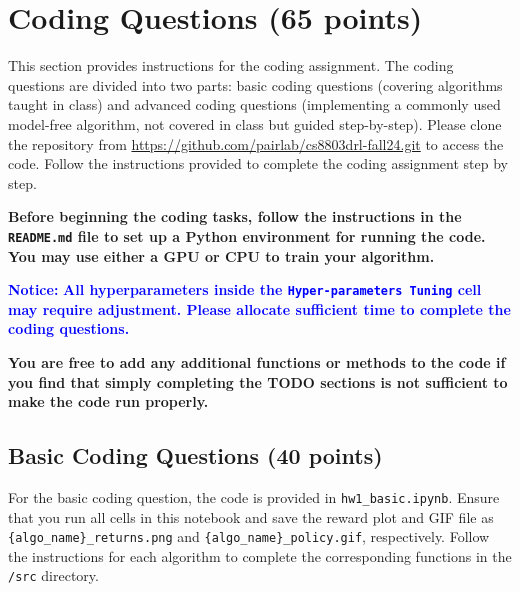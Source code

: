 \documentclass[letterpaper,12pt,addpoints]{exam}
\begin{document}
\begin{questions}
    \newpage
    \begin{solution}[2.5in]
        \end{solution}
    
    
    \begin{solution}[0.5cm]
        \end{solution}

 
\end{questions}


\newpage

\section{Coding Questions (65 points)}
This section provides instructions for the coding assignment. The coding questions are divided into two parts: basic coding questions (covering algorithms taught in class) and advanced coding questions (implementing a commonly used model-free algorithm, not covered in class but guided step-by-step). Please clone the repository from \url{https://github.com/pairlab/cs8803drl-fall24.git} to access the code. Follow the instructions provided to complete the coding assignment step by step.

\textbf{Before beginning the coding tasks, follow the instructions in the \texttt{README.md} file to set up a Python environment for running the code. You may use either a GPU or CPU to train your algorithm.
}


\textbf{\textcolor{blue}{Notice:}} \textbf{\textcolor{blue}{All hyperparameters inside the \texttt{Hyper-parameters Tuning} cell may require adjustment. Please allocate sufficient time to complete the coding questions.}}


\textbf{You are free to add any additional functions or methods to the code if you find that simply completing the TODO sections is not sufficient to make the code run properly.}

\subsection{Basic Coding Questions (40 points)}
For the basic coding question, the code is provided in \texttt{hw1\_basic.ipynb}. Ensure that you run all cells in this notebook and save the reward plot and GIF file as \texttt{\{algo\_name\}\_returns.png} and \texttt{\{algo\_name\}\_policy.gif}, respectively. Follow the instructions for each algorithm to complete the corresponding functions in the \texttt{/src} directory. 
\end{document}
